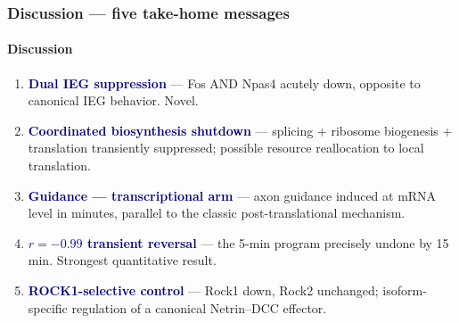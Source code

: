 \documentclass[aspectratio=169,11pt]{beamer}
\newcommand{\hi}[1]{\textcolor{navy}{\textbf{#1}}}
\begin{document}
\begin{frame}
  \frametitle{Discussion --- five take-home messages}\framesubtitle{Discussion}
  \footnotesize
  \begin{enumerate}\setlength\itemsep{5pt}
    \item[\colorbox{teal}{\color{white}\bfseries\,1\,}] \hi{Dual IEG suppression} ---
      Fos AND Npas4 acutely down, opposite to canonical IEG behavior. Novel.
    \item[\colorbox{teal}{\color{white}\bfseries\,2\,}] \hi{Coordinated biosynthesis shutdown}
      --- splicing + ribosome biogenesis + translation transiently suppressed;
      possible resource reallocation to local translation.
    \item[\colorbox{teal}{\color{white}\bfseries\,3\,}] \hi{Guidance --- transcriptional arm}
      --- axon guidance induced at mRNA level in minutes, parallel to the classic
      post-translational mechanism.
    \item[\colorbox{teal}{\color{white}\bfseries\,4\,}] \hi{$r=-0.99$ transient reversal}
      --- the 5-min program precisely undone by 15 min. Strongest quantitative result.
    \item[\colorbox{teal}{\color{white}\bfseries\,5\,}] \hi{ROCK1-selective control}
      --- Rock1 down, Rock2 unchanged; isoform-specific regulation of a canonical
      Netrin--DCC effector.
  \end{enumerate}
\end{frame}
\end{document}
